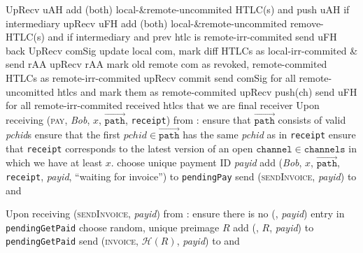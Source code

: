 \begin{algorithmic}[1]
    \State UpRecv uAH add (both) local-\&remote-uncommited HTLC(s) and push uAH
    if intermediary
    \State upRecv uFH add (both) local-\&remote-uncommited remove-HTLC(s) and if
    intermediary and prev htlc is remote-irr-commited send uFH back
    \State UpRecv comSig update local com, mark diff HTLCs as local-irr-commited
    \& send rAA
    \State upRecv rAA mark old remote com as revoked, remote-commited HTLCs as
    remote-irr-commited
    \State upRecv commit send comSig for all remote-uncomitted htlcs and mark
    them as remote-commited
    \State upRecv push(ch) send uFH for all remote-irr-commited received htlcs
    that we are final receiver
    \State {}
    \State Upon receiving (\textsc{pay}, \textit{Bob}, $x$,
    $\overrightarrow{\mathtt{path}}$, \texttt{receipt}) from \environment:
    \Indent
      \State ensure that $\overrightarrow{\mathtt{path}}$ consists of valid
      \textit{pchid}s
      \State ensure that the first $\mathit{pchid} \in
      \overrightarrow{\mathtt{path}}$ has the same \textit{pchid} as in
      \texttt{receipt}
      \State ensure that \texttt{receipt} corresponds to the latest version of
      an open $\mathtt{channel} \in \mathtt{channels}$ in which we have at least
      $x$.
      \State choose unique payment ID \textit{payid} 
      \State add (\textit{Bob}, $x$, $\overrightarrow{\mathtt{path}}$,
      \texttt{receipt}, \textit{payid}, ``waiting for invoice'') to
      \texttt{pendingPay}
      \State send (\textsc{sendInvoice}, \textit{payid}) to \bob{} and
      \adversary
    \EndIndent
    \State

    \State Upon receiving (\textsc{sendInvoice}, \textit{payid}) from \bob:
    \Indent
      \State ensure there is no (\bob, \textit{payid}) entry in
      \texttt{pendingGetPaid}
      \State choose random, unique preimage $R$
      \State add (\bob, $R$, \textit{payid}) to \texttt{pendingGetPaid}
      \State send (\textsc{invoice}, $\mathcal{H}\left(R\right)$,
      \textit{payid}) to \bob{} and \adversary
    \EndIndent
    \State


\end{algorithmic}
